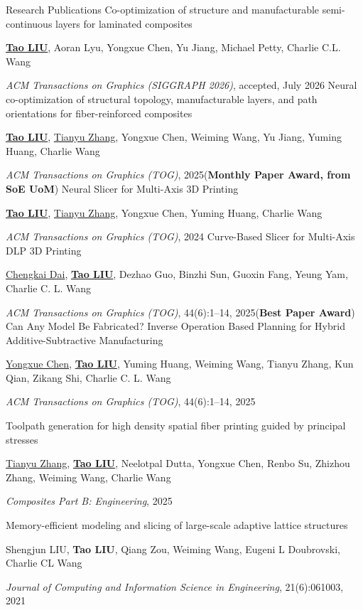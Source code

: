 \begin{rubric}{Research Publications}
\entry*[]
	[14] Co-optimization of structure and manufacturable semi-continuous layers for laminated composites
	\par \underline{\textbf{Tao LIU}}, Aoran Lyu, Yongxue Chen, Yu Jiang, Michael Petty, Charlie C.L. Wang
	\par \textit{ACM Transactions on Graphics (SIGGRAPH 2026)}, accepted, July 2026
%
\entry*[]
	[13] Neural co-optimization of structural topology, manufacturable layers, and path orientations for fiber-reinforced composites
	\par \underline{\textbf{Tao LIU}}, \underline{Tianyu Zhang}, Yongxue Chen, Weiming Wang, Yu Jiang, Yuming Huang, Charlie Wang
	\par \textit{ACM Transactions on Graphics (TOG)}, 2025(\textbf{Monthly Paper Award, from SoE UoM})
%
\entry*[]
	[12] Neural Slicer for Multi-Axis 3D Printing
	\par \underline{\textbf{Tao LIU}}, \underline{Tianyu Zhang}, Yongxue Chen, Yuming Huang, Charlie Wang
	\par \textit{ACM Transactions on Graphics (TOG)}, 2024
%
\entry*[]
	[11] Curve-Based Slicer for Multi-Axis DLP 3D Printing
	\par \underline{Chengkai Dai}, \underline{\textbf{Tao LIU}}, Dezhao Guo, Binzhi Sun, Guoxin Fang, Yeung Yam, Charlie C. L. Wang 
	\par \textit{ACM Transactions on Graphics (TOG)}, 44(6):1--14, 2025(\textbf{Best Paper Award})
%
\entry*[]
	[10] Can Any Model Be Fabricated? Inverse Operation Based Planning for Hybrid Additive-Subtractive Manufacturing
	\par \underline{Yongxue Chen}, \underline{\textbf{Tao LIU}}, Yuming Huang, Weiming Wang, Tianyu Zhang, Kun Qian, Zikang Shi, Charlie C. L. Wang
	\par \textit{ACM Transactions on Graphics (TOG)}, 44(6):1--14, 2025

\entry*[]
	[9] Toolpath generation for high density spatial fiber printing guided by principal stresses
	\par \underline{Tianyu Zhang}, \underline{\textbf{Tao LIU}}, Neelotpal Dutta, Yongxue Chen, Renbo Su, Zhizhou Zhang, Weiming Wang, Charlie Wang
	\par \textit{Composites Part B: Engineering}, 2025

\entry*[]
	[8] Memory-efficient modeling and slicing of large-scale adaptive lattice structures
	\par Shengjun LIU, \textbf{Tao LIU}, Qiang Zou, Weiming Wang, Eugeni L Doubrovski, Charlie CL Wang
	\par \textit{Journal of Computing and Information Science in Engineering}, 21(6):061003, 2021


\end{rubric}
